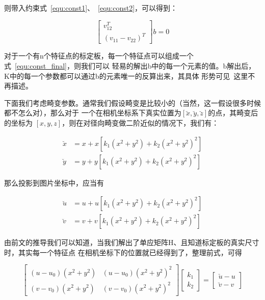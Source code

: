 则带入约束式~\ref{equ:const1}、~\ref{equ:const2}，可以得到：

\begin{equation}
	\label{equ:const_final}
	\begin{bmatrix}
		v_{12}^T \\
		(v_11 - v_22)^T
	\end{bmatrix}
	b = 0
\end{equation}

对于一个有n个特征点的标定板，每一个特征点可以组成一个式~\ref{equ:const_final}，则我们可以
轻易的解出b中的每一个元素的值。b解出后，K中的每一个参数都可以通过b的元素唯一的反算出来，其具体
形势可见~\cite{zhang2000flexible}这里不再描述。

下面我们考虑畸变参数。通常我们假设畸变是比较小的（当然，这一假设很多时候都不怎么对），那么对于
一个在相机坐标系下真实位置为$[\breve{x}, \breve{y}, \breve{z}]$的点，其畸变后的坐标为
$[x, y, z]$，则在对径向畸变做二阶近似的情况下，我们有：

\begin{equation}
  \begin{aligned}
  	\breve{x} &= x + x[k_1(x^2 + y^2) + k_2(x^2 + y^2)^2] \\
  	\breve{y} &= y + y[k_1(x^2 + y^2) + k_2(x^2 + y^2)^2]
  \end{aligned}
\end{equation}

那么投影到图片坐标中，应当有

\begin{equation}
  \begin{aligned}
  	\breve{u} &= u + u[k_1(x^2 + y^2) + k_2(x^2 + y^2)^2] \\
  	\breve{v} &= v + v[k_1(x^2 + y^2) + k_2(x^2 + y^2)^2]
  \end{aligned}
\end{equation}

由前文的推导我们可以知道，当我们解出了单应矩阵H、且知道标定板的真实尺寸时，其实每一个特征点
在相机坐标下的位置就已经得到了，整理前式，可得


\begin{equation}
	\label{equ:dist}
	\begin{bmatrix}
		(u - u_0)(x^2 + y^2) & (u - u_0)(x^2 + y^2)^2 \\
		(v - v_0)(x^2 + y^2) & (v - v_0)(x^2 + y^2)^2
	\end{bmatrix}
	\begin{bmatrix}
		k_1 \\
		k_2
	\end{bmatrix}
	=
	\begin{bmatrix}
		\breve{u} - u \\
		\breve{v} - v
	\end{bmatrix}
\end{equation}

